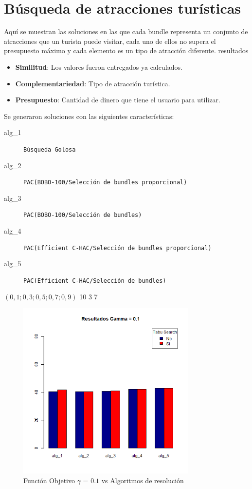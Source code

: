 \section{Búsqueda de atracciones turísticas}\label{res:busAtracciones}
Aquí se muestran las soluciones en las que cada bundle representa un conjunto de atracciones que un turista puede visitar, cada uno de ellos no supera el presupuesto máximo y cada elemento es un tipo de atracción diferente. resultados
\begin{itemize}
  \item \textbf{Similitud}: Los valores fueron entregados ya calculados.
  \item \textbf{Complementariedad}: Tipo de atracción turística.
  \item \textbf{Presupuesto}: Cantidad de dinero que tiene el usuario para utilizar.
\end{itemize}
Se generaron soluciones con las siguientes características:\\
\SolucionBudget
{}
{
\begin{description}
	\item[alg\_1] \texttt{Búsqueda Golosa}
	\item[alg\_2] \texttt{PAC(BOBO-100/Selección de bundles proporcional)}
	\item[alg\_3] \texttt{PAC(BOBO-100/Selección de bundles)}
	\item[alg\_4] \texttt{PAC(Efficient C-HAC/Selección de bundles proporcional)}
	\item[alg\_5] \texttt{PAC(Efficient C-HAC/Selección de bundles)}
\end{description}
}
{$(0,1; 0,3; 0,5; 0,7; 0,9)$}
{10}
{3}
{7}

\begin{figure}[H]
  \centering
    \includegraphics[width=0.8\textwidth]{resultados/cities/Graficos_agrupados/gamma01-cities.png}
  \caption{Función Objetivo $\gamma$ = $0.1$ vs Algoritmos de resolución}
  \label{res:img-cities-agr-gamma01}
\end{figure}

